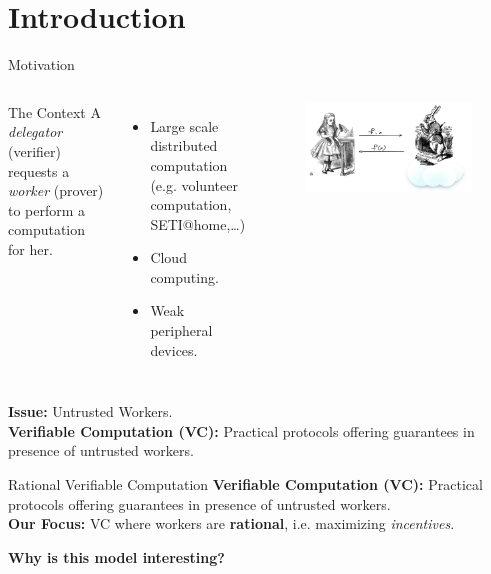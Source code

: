 \section{Introduction}

\begin{frame}{Motivation}

\begin{columns}
\begin{block}{The Context}
	A \textit{delegator} (verifier) requests a \textit{worker} (prover) to perform a computation for her.
\end{block}
\onslide<+->
\begin{itemize}[<+- | alert@+>]
	\item Large scale distributed computation (e.g. volunteer computation, SETI@home,\dots)
	\item Cloud computing.
	\item Weak peripheral devices.
\end{itemize}
\begin{figure}
	\includegraphics[scale=0.17]{pics/alice.png}
\end{figure}
\end{columns}
\pause
\bigskip
\textbf{Issue: } Untrusted Workers.\\
\pause
\medskip
\textbf{Verifiable Computation (VC):} Practical protocols offering guarantees in presence of untrusted workers.
\end{frame}

\begin{frame}[t]{Rational Verifiable Computation}
\textbf{Verifiable Computation (VC):} Practical protocols offering guarantees in presence of untrusted workers.\\ \pause
\vspace{1.6cm}
{\large \textbf{Our Focus: } VC where workers are \textbf{rational}, \pause i.e. maximizing \textit{incentives}.} \pause

\vspace{1.3cm}
\textbf{Why is this model interesting?}


\end{frame}


